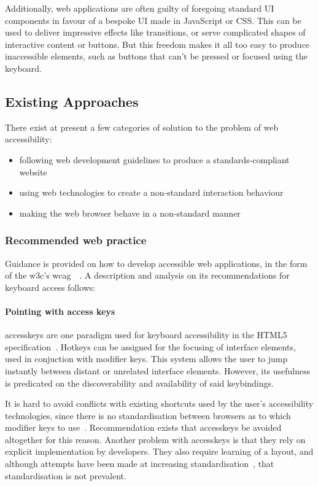 \documentclass[a4paper, 11pt]{article}
\begin{document}
Additionally, web applications are often guilty of foregoing standard UI components in favour of a bespoke UI made in JavaScript or CSS. This can be used to deliver impressive effects like transitions, or serve complicated shapes of interactive content or buttons. But this freedom makes it all too easy to produce inaccessible elements, such as buttons that can't be pressed or focused using the keyboard.

\subsection{Existing Approaches}
There exist at present a few categories of solution to the problem of web accessibility:
\begin{itemize}
\item following web development guidelines to produce a standards-compliant website
\item using web technologies to create a non-standard interaction behaviour
\item making the web browser behave in a non-standard manner
\end{itemize}
\subsubsection{Recommended web practice}
\label{recommendedpracticesection}
Guidance is provided on how to develop accessible web applications, in the form of the \gls{w3c}'s \gls{wcag}~\cite{chisholm2001web}~\cite{wcag}. A description and analysis on its recommendations for keyboard access follows:
\paragraph{Pointing with access keys}
\label{accesskeysection}
  \Gls{accesskeys} are one paradigm used for keyboard accessibility in the HTML5 specification~\cite{html5specaccesskeys}. Hotkeys can be assigned for the focusing of interface elements, used in conjuction with modifier keys. This system allows the user to jump instantly between distant or unrelated interface elements. However, its usefulness is predicated on the discoverability and availability of said \glspl{keybinding}.

  It is hard to avoid conflicts with existing shortcuts used by the user's accessibility technologies, since there is no standardisation between browsers as to which modifier keys to use~\cite{webaimaccesskeys}. Recommendation exists that \gls{accesskeys} be avoided altogether for this reason. Another problem with \gls{accesskeys} is that they rely on explicit implementation by developers. They also require learning of a layout, and although attempts have been made at increasing standardisation~\cite{AccesskeyStandardisation}, that standardisation is not prevalent.
\end{document}
